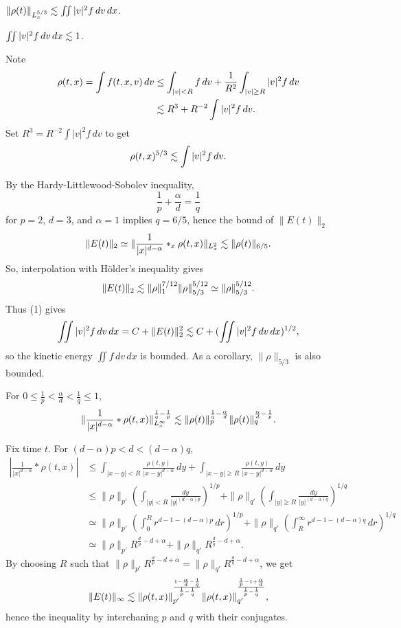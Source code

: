 \documentclass[11pt]{amsart}
\begin{document}
\begin{lem}$ $\\[-12pt]
\begin{cond}
\item $\|\rho(t)\|_{L_x^{5/3}}\lesssim\iint|v|^2f\,dv\,dx$.
\item $\iint|v|^2f\,dv\,dx\lesssim1$.
\end{cond}
\end{lem}
\begin{pfs}
\item
Note
\begin{align*}
\rho(t,x)=\int f(t,x,v)\,dv
&\le\int_{|v|<R}f\,dv+\frac1{R^2}\int_{|v|\ge R}|v|^2f\,dv\\
&\lesssim R^3+ R^{-2}\int|v|^2f\,dv.
\end{align*}
Set $R^3=R^{-2}\int|v|^2f\,dv$ to get
\[\rho(t,x)^{5/3}\lesssim\int|v|^2f\,dv.\]

\item
By the Hardy-Littlewood-Sobolev inequality,
\[\frac1p+\frac\alpha d=\frac1q\]
for $p=2$, $d=3$, and $\alpha=1$ implies $q=6/5$, hence the bound of $\|E(t)\|_2$
\[\|E(t)\|_2\simeq\|\frac1{|x|^{d-\alpha}}*_x\rho(t,x)\|_{L_x^2}\lesssim\|\rho(t)\|_{6/5}.\]
So, interpolation with H\"older's inequality gives
\[\|E(t)\|_2\lesssim\|\rho\|_1^{7/12}\|\rho\|_{5/3}^{5/12}\simeq\|\rho\|_{5/3}^{5/12}.\]
Thus (1) gives
\[\iint|v|^2f\,dv\,dx=C+\|E(t)\|_2^2\lesssim C+(\iint|v|^2f\,dv\,dx)^{1/2},\]
so the kinetic energy $\iint f\,dv\,dx$ is bounded.
As a corollary, $\|\rho\|_{5/3}$ is also bounded.\qedhere
\end{pfs}


\begin{lem}
For $0\le\frac1p<\frac\alpha d<\frac1q\le1$,
\[\|\frac1{|x|^{d-\alpha}}*\rho(t,x)\|_{L_x^\infty}^{\frac1q-\frac1p}\lesssim\|\rho(t)\|_p^{\frac1q-\frac\alpha d}\|\rho(t)\|_q^{\frac\alpha d-\frac1p}.\]
\end{lem}
\begin{pf}
Fix time $t$.
For $(d-\alpha)p<d<(d-\alpha)q$,
\begin{align*}
|\frac1{|x|^{d-\alpha}}*\rho(t,x)|
&\le\int_{|x-y|<R}\frac{\rho(t,y)}{|x-y|^{d-\alpha}}\,dy+\int_{|x-y|\ge R}\frac{\rho(t,y)}{|x-y|^{d-\alpha}}\,dy\\
&\le\|\rho\|_{p'}(\int_{|y|<R}\frac{dy}{|y|^{(d-\alpha)p}})^{1/p}+\|\rho\|_{q'}(\int_{|y|\ge R}\frac{dy}{|y|^{(d-\alpha)q}})^{1/q}\\
&\simeq\|\rho\|_{p'}(\int_0^Rr^{d-1-(d-\alpha)p}\,dr)^{1/p}+\|\rho\|_{q'}(\int_R^\infty r^{d-1-(d-\alpha)q}\,dr)^{1/q}\\
&\simeq\|\rho\|_{p'}R^{\frac dp-d+\alpha}+\|\rho\|_{q'}R^{\frac dq-d+\alpha}.
\end{align*}
By choosing $R$ such that $\|\rho\|_{p'}R^{\frac dp-d+\alpha}=\|\rho\|_{q'}R^{\frac dq-d+\alpha}$, we get
\[\|E(t)\|_\infty\lesssim\|\rho(t,x)\|_{p'}^{\frac{1-\frac\alpha d-\frac1q}{\frac1p-\frac1q}}\|\rho(t,x)\|_{q'}^{\frac{\frac1p-1+\frac\alpha d}{\frac1p-\frac1q}},\]
hence the inequality by interchaning $p$ and $q$ with their conjugates.
\end{pf}
\end{document}
